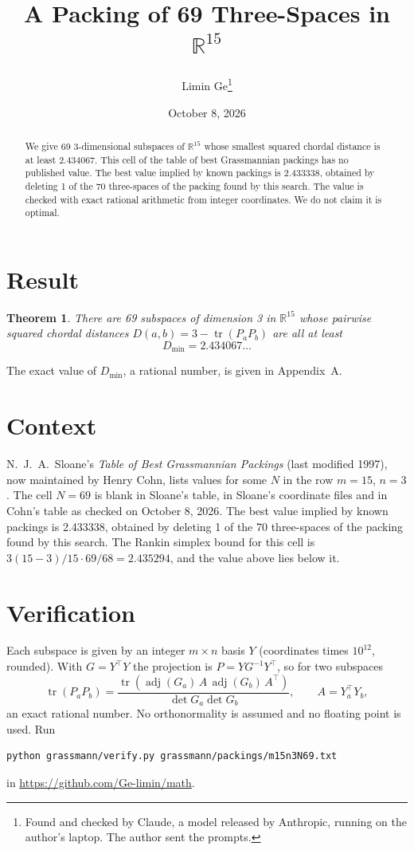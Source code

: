 \documentclass[11pt,a4paper]{article}
\title{A Packing of 69 Three-Spaces in $\mathbb{R}^{15}$}
\author{Limin Ge\thanks{Found and checked by Claude, a model released by Anthropic, running on the author's laptop. The author sent the prompts.}}
\date{October 8, 2026}
\newtheorem*{theorem}{Theorem}
\begin{document}
\maketitle
\begin{abstract}
We give 69 3-dimensional subspaces of $\mathbb{R}^{15}$ whose smallest squared chordal distance is at least 2.434067. This cell of the table of best Grassmannian packings has no published value. The best value implied by known packings is 2.433338, obtained by deleting 1 of the 70 three-spaces of the packing found by this search. The value is checked with exact rational arithmetic from integer coordinates. We do not claim it is optimal.
\end{abstract}

\section{Result}
\begin{theorem}
There are 69 subspaces of dimension 3 in $\mathbb{R}^{15}$ whose pairwise squared chordal distances $D(a,b) = 3 - \operatorname{tr}(P_aP_b)$ are all at least
\[ D_{\min} = 2.434067\ldots \]
\end{theorem}
The exact value of $D_{\min}$, a rational number, is given in Appendix~A.


\section{Context}
N.~J.~A.~Sloane's \emph{Table of Best Grassmannian Packings} (last modified 1997), now maintained by Henry Cohn, lists values for some $N$ in the row $m=15$, $n=3$. The cell $N=69$ is blank in Sloane's table, in Sloane's coordinate files and in Cohn's table as checked on October 8, 2026. The best value implied by known packings is 2.433338, obtained by deleting 1 of the 70 three-spaces of the packing found by this search. The Rankin simplex bound for this cell is $3(15-3)/15\cdot 69/68 = 2.435294$, and the value above lies below it.


\section{Verification}
Each subspace is given by an integer $m\times n$ basis $Y$ (coordinates times $10^{12}$, rounded). With $G=Y^\top Y$ the projection is $P=YG^{-1}Y^\top$, so for two subspaces
\[ \operatorname{tr}(P_aP_b)=\frac{\operatorname{tr}(\operatorname{adj}(G_a)\,A\,\operatorname{adj}(G_b)\,A^\top)}{\det G_a\det G_b},\qquad A=Y_a^\top Y_b, \]
an exact rational number. No orthonormality is assumed and no floating point is used. Run
\begin{verbatim}
python grassmann/verify.py grassmann/packings/m15n3N69.txt
\end{verbatim}
in \url{https://github.com/Ge-limin/math}.
\end{document}
